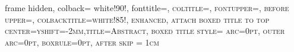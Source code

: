 



{
	frame hidden,
	colback= white!90!\absColor{\thechapCnt}, %
	fonttitle=\scshape, coltitle=\ColorTheme,%
	fontupper=\small,
	before upper={\parindent15pt},
	colbacktitle=white!85!\absColor{\thechapCnt},
	enhanced,
	attach boxed title to top center={yshift=-2mm},title=Abstract,
	boxed title style= {arc=0pt, outer arc=0pt, boxrule=0pt, after skip = 1cm}
}

\abstractrunin %
\setlength{\abstitleskip}{0pt}
\renewcommand{\abstractnamefont}{\normalfont\small\scshape}
\abslabeldelim{\;--\;}
\renewcommand{\abstracttextfont}{\normalfont\small\itshape}
\let\oldendabstract\endabstract
\def\endabstract{%
	\oldendabstract
	\fancybreak{\rule{0pt}{\onelineskip}}%
}

